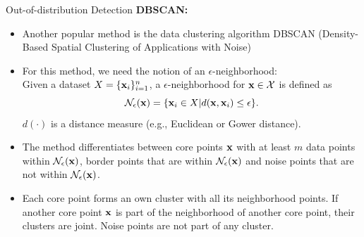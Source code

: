 \documentclass[11pt,compress,t,notes=noshow, aspectratio=169, xcolor=table]{beamer}
\begin{document}
\begin{frame}{Out-of-distribution Detection}
\textbf{DBSCAN:}
\begin{itemize}
	\item Another popular method is the data clustering algorithm DBSCAN (Density-Based Spatial Clustering of Applications with Noise) 
	\item For this method, we need the notion of an $\epsilon$-neighborhood: \\
	Given a dataset $X = \{\xv_i\}_{i = 1}^n$, a $\epsilon$-neighborhood for $\xv \in \Xspace$ is defined as 
	$$ \mathcal{N}_{\epsilon}(\xv) = \{\xv_i \in X | d(\xv, \xv_i) \le \epsilon\}.$$
	 $d(\cdot)$ is a distance measure (e.g., Euclidean or Gower distance). 
	\item The method differentiates between core points $\xv$ with at least $m$ data points within $\mathcal{N}_{\epsilon}(\xv)$, border points that are within $\mathcal{N}_{\epsilon}(\xv)$ and noise points that are not within $\mathcal{N}_{\epsilon}(\xv)$.
	\item Each core point forms an own cluster with all its neighborhood points. If another core point $\xv$ is part of the neighborhood of another core point, their clusters are joint. Noise points are not part of any cluster. 
\end{itemize}
\vspace{-0.6cm}
\end{frame}
\end{document}
